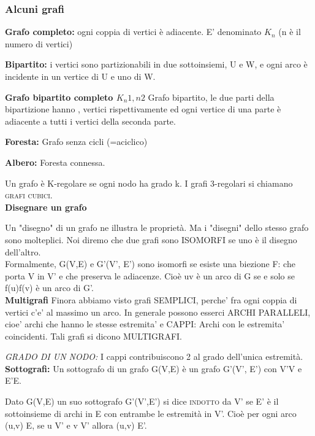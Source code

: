 \documentclass[12pt,a4paper]{article}
\begin{document}
\subsubsection{Alcuni grafi} \par
\textbf{Grafo completo:} ogni coppia di vertici è adiacente. E' denominato $K_n$ (n è il numero di vertici) \par
\textbf{Bipartito:} i vertici sono partizionabili in due sottoinsiemi, U e W, e ogni arco è incidente in un vertice di U e uno di W. \par
\textbf{Grafo bipartito completo $K_n1,n2$} Grafo bipartito, le due parti della bipartizione hanno ,  vertici rispettivamente ed ogni vertice di una parte è adiacente a tutti i vertici della seconda parte. \par
\textbf{Foresta:} Grafo senza cicli (=aciclico) \par
\textbf{Albero:} Foresta connessa. \par
Un grafo è K-regolare se ogni nodo ha grado k. I grafi 3-regolari si chiamano \textsc{grafi cubici}. \\


\textbf{Disegnare un grafo} \par
 Un "disegno" di un grafo ne illustra le proprietà. Ma i "disegni" dello stesso grafo sono molteplici. Noi
diremo che due grafi sono \textsc{ISOMORFI} se uno è il disegno dell'altro. \\
Formalmente, G(V,E) e G’(V’, E’) sono isomorfi se esiste una biezione F: che porta V in V’ e che preserva le
adiacenze. Cioè uv è un arco di G se e solo se f(u)f(v) è un arco di G’. \\

\textbf{Multigrafi} Finora abbiamo visto grafi SEMPLICI, perche' fra ogni coppia di vertici c'e' al massimo un arco. In generale possono esserci ARCHI PARALLELI, cioe' archi che hanno le stesse estremita' e CAPPI: Archi
con le estremita' coincidenti. Tali grafi si dicono MULTIGRAFI. \par
\textit{GRADO DI UN NODO:} I cappi contribuiscono 2 al grado dell'unica estremità.\\

\textbf{Sottografi:} Un sottografo di un grafo G(V,E) è un grafo G'(V', E') con V'\subseteq V e E'\subseteq E. \par
Dato G(V,E) un suo sottografo G'(V',E') si dice \textsc{indotto} da V' se E' è il sottoinsieme di archi in E con entrambe le estremità in V'. Cioè per ogni arco (u,v) \in E, se u \in V' e v \in V' allora (u,v) \in E'. \\
\end{document}
